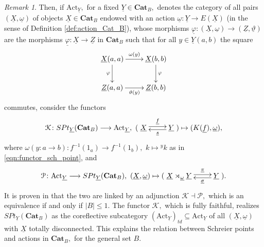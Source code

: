 \documentclass[11pt]{amsart}
\theoremstyle{plain}
\theoremstyle{definition}
\theoremstyle{remark}
\newtheorem{remark}[subsubsection]{Remark}
\newcommand{\un}{\underline}
\begin{document}
\begin{remark}
Then, if $\mathrm{Act}_{\un{Y}},$ for a fixed $\un{Y}\in\mathbf{Cat}_B,$ denotes the category of all pairs $(\un{X},\un{\omega})$ of objects $\un{X}\in\mathbf{Cat}_B$ endowed with an action $\un{\omega}\colon\un{Y}\rightarrow E(\un{X})$ (in the sense of Definition \ref{def:action_Cat_B}), whose morphisms $\un{\varphi}\colon(\un{X},\un{\omega})\rightarrow(\un{Z},\un{\vartheta})$ are the morphisms $\un{\varphi}\colon\un{X}\rightarrow\un{Z}$ in $\mathbf{Cat}_B$ such that for all $y\in\un{Y}(a,b)$ the square
\begin{equation*}
\xymatrix{
{\un{X}(a,a)} \ar[d]_-{\varphi} \ar[r]^-{\omega(y)} &{\un{X}(b,b)} \ar[d]^-{\varphi} \\
{\un{Z}(a,a)} \ar[r]_-{\vartheta(y)} &{\un{Z}(b,b)}
}
\end{equation*}
commutes, consider the functors
\begin{equation}
\label{eqn:K}
\mathcal{K}\colon SPt_{\un{Y}}(\mathbf{Cat}_B)\longrightarrow\mathrm{Act}_{\un{Y}}, \ (\xymatrix{{\underline{X}} \ar@<.5ex>[r]^-{\underline{f}} &{\underline{Y}} \ar@<.5ex>[l]^-{\underline{s}}})\mapsto (K(\un{f}),\un{\omega}),
\end{equation}
where $\omega(y\colon a\rightarrow b)\colon f^{-1}(1_a)\rightarrow f^{-1}(1_b),$ $k\mapsto {^yk}$ as in \eqref{eqn:functor_sch_point}, and
\begin{equation*}
\mathcal{P}\colon\mathrm{Act}_{\un{Y}}\longrightarrow SPt_{\un{Y}}(\mathbf{Cat}_B), \ (\un{X},\un{\omega})\mapsto(\xymatrix{{\underline{X}\rtimes_{\un{\omega}}\un{Y}} \ar@<.5ex>[r]^-{\underline{\pi}} &{\underline{Y}} \ar@<.5ex>[l]^-{\underline{\sigma}}}).
\end{equation*}
It is proven in \cite{a1} that the two are linked by an adjunction $\mathcal{K}\dashv\mathcal{P},$ which is an equivalence if and only if $|B| \leq 1.$ The functor $\mathcal{K},$ which is fully faithful, realizes $SPt_{\un{Y}}(\mathbf{Cat}_B)$ as the coreflective subcategory $(\mathrm{Act}_{\un{Y}})_{td}\subseteq\mathrm{Act}_{\un{Y}}$ of all $(\un{X},\un{\omega})$ with $\un{X}$ totally disconnected. This explains the relation between Schreier points and actions in $\mathbf{Cat}_B,$ for the general set $B.$
\end{remark}
\end{document}
